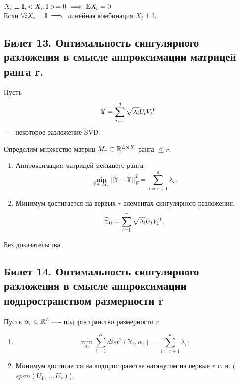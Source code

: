 $X_i \perp \mathbb{I}, < X_i, \mathbb{I} > = 0 \ \Longrightarrow \  \mathbb{E}X_i = 0$\\
Если $\forall i X_i \perp \mathbb{I} \ \Longrightarrow \ $ линейная комбинация $X_i \perp \mathbb{I}$.

\subsection{ Билет 13. Оптимальность сингулярного разложения в смысле аппроксимации матрицей ранга r.}

Пусть \[\mathbb{Y} = \sum_{i=1}^{d}\sqrt{\lambda_i}U_iV_i^{\rm T}\] —- некоторое разложение SVD.

Определим множество матриц $M_r\subset \mathbb{R}^{L\times K}$ ранга $\leq r$.

\begin{sug}

\begin{enumerate}
\item Аппроксимация матрицей меньшего ранга: $$\min_{\mathbb{Y}\in M_r} ||\mathbb{Y}-\mathbb{\widetilde{Y}}||_F^2=\sum_{i=r+1}^{d}\lambda_i; $$
\item Минимум достигается на первых $r$ элементах сингулярного разложения:
\[\mathbb{\widetilde{Y}}_0=\sum_{i=1}^{r} \sqrt{\lambda_i}U_iV_i^{\rm T}.\]
\end{enumerate}
\end{sug}

Без доказательства. 

\subsection{ Билет 14. Оптимальность сингулярного разложения в смысле аппроксимации подпространством размерности r}

Пусть $\alpha_r \in \mathbb{R}^{L}$ —- подпространство размерности $r$.

\begin{sug}

\begin{enumerate}
\item $$\min_{\alpha_r} \sum_{i=1}^{K}dist^2(\mathbb{Y}_i,\alpha_r)=\sum_{i=r+1}^{d}\lambda_i; $$
\item Минимум достигается на подпространстве натянутом на первые $r$ с. в. ($span(U_1,\ldots , U_r)$).
\end{enumerate}
\end{sug}
